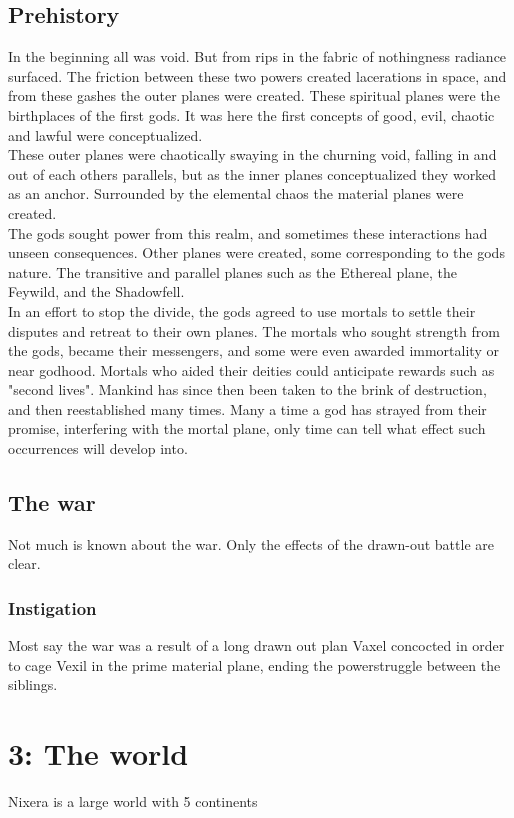 \documentclass[a4paper]{article}
\begin{document}
\subsection{Prehistory}
In the beginning all was void. But from rips in the fabric of nothingness radiance surfaced. The friction between these two powers created lacerations in space, and from these gashes the outer planes were created. These spiritual planes were the birthplaces of the first gods. It was here the first concepts of good, evil, chaotic and lawful were conceptualized.\\
These outer planes were chaotically swaying in the churning void, falling in and out of each others parallels, but as the inner planes conceptualized they worked as an anchor. Surrounded by the elemental chaos the material planes were created.\\
The gods sought power from this realm, and sometimes these interactions had unseen consequences. Other planes were created, some corresponding to the gods nature. The transitive and parallel planes such as the Ethereal plane, the Feywild, and the Shadowfell.\\
In an effort to stop the divide, the gods agreed to use mortals to settle their disputes and retreat to their own planes. The mortals who sought strength from the gods, became their messengers, and some were even awarded immortality or near godhood. Mortals who aided their deities could anticipate rewards such as "second lives". Mankind has since then been taken to the brink of destruction, and then reestablished many times. Many a time a god has strayed from their promise, interfering with the mortal plane, only time can tell what effect such occurrences will develop into.

\subsection{The war}
Not much is known about the war. Only the effects of the drawn-out battle are clear. 
 
\subsubsection{Instigation}
Most say the war was a result of a long drawn out plan Vaxel concocted in order to cage Vexil in the prime material plane, ending the powerstruggle between the siblings.

\section{3: The world}
Nixera is a large world with 5 continents
\end{document}
